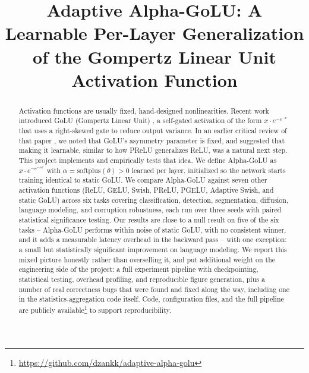 \documentclass[conference]{IEEEtran}
\begin{document}
\title{Adaptive Alpha-GoLU: A Learnable Per-Layer Generalization\\ of the Gompertz Linear Unit Activation Function}

\author{
}

\maketitle

\begin{abstract}
Activation functions are usually fixed, hand-designed nonlinearities. Recent work introduced GoLU (Gompertz Linear Unit) \cite{golu2025}, a self-gated activation of the form $x \cdot e^{-e^{-x}}$ that uses a right-skewed gate to reduce output variance. In an earlier critical review of that paper \cite{kopic2026critical}, we noted that GoLU's asymmetry parameter is fixed, and suggested that making it learnable, similar to how PReLU generalizes ReLU, was a natural next step. This project implements and empirically tests that idea. We define Alpha-GoLU as $x \cdot e^{-e^{-\alpha x}}$ with $\alpha = \text{softplus}(\theta) > 0$ learned per layer, initialized so the network starts training identical to static GoLU. We compare Alpha-GoLU against seven other activation functions (ReLU, GELU, Swish, PReLU, PGELU, Adaptive Swish, and static GoLU) across six tasks covering classification, detection, segmentation, diffusion, language modeling, and corruption robustness, each run over three seeds with paired statistical significance testing. Our results are close to a null result on five of the six tasks -- Alpha-GoLU performs within noise of static GoLU, with no consistent winner, and it adds a measurable latency overhead in the backward pass -- with one exception: a small but statistically significant improvement on language modeling. We report this mixed picture honestly rather than overselling it, and put additional weight on the engineering side of the project: a full experiment pipeline with checkpointing, statistical testing, overhead profiling, and reproducible figure generation, plus a number of real correctness bugs that were found and fixed along the way, including one in the statistics-aggregation code itself. Code, configuration files, and the full pipeline are publicly available\footnote{\url{https://github.com/dzankk/adaptive-alpha-golu}} to support reproducibility.
\end{abstract}
\end{document}
